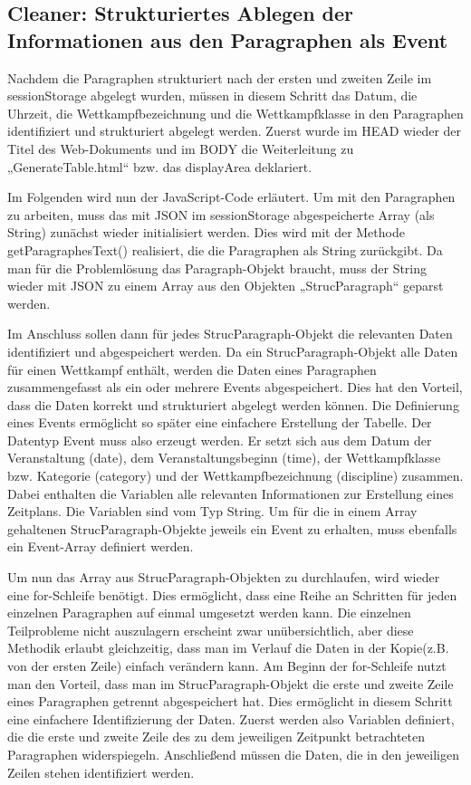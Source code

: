 {\subsection{Cleaner: Strukturiertes Ablegen der Informationen aus den Paragraphen als Event}

Nachdem die Paragraphen strukturiert nach der ersten und zweiten Zeile im sessionStorage abgelegt wurden, müssen in diesem Schritt das Datum, die Uhrzeit, die Wettkampfbezeichnung und die Wettkampfklasse in den Paragraphen identifiziert und strukturiert abgelegt werden. 
Zuerst wurde im HEAD wieder der Titel des Web-Dokuments und im BODY die Weiterleitung zu „GenerateTable.html“ bzw. das displayArea deklariert.

Im Folgenden wird nun der JavaScript-Code erläutert. Um mit den Paragraphen zu arbeiten, muss das mit JSON im sessionStorage abgespeicherte Array (als String) zunächst wieder initialisiert werden. Dies wird mit der Methode getParagraphesText() realisiert, die die Paragraphen als String zurückgibt. Da man für die Problemlösung das Paragraph-Objekt braucht, muss der String wieder mit \ac{JSON} zu einem Array aus den Objekten „StrucParagraph“ geparst werden.

Im Anschluss sollen dann für jedes StrucParagraph-Objekt die relevanten Daten identifiziert und abgespeichert werden. Da ein StrucParagraph-Objekt alle Daten für einen Wettkampf enthält, werden die Daten eines Paragraphen zusammengefasst als ein oder mehrere Events abgespeichert. Dies hat den Vorteil, dass die Daten korrekt und strukturiert abgelegt werden können. Die Definierung eines Events ermöglicht so später eine einfachere Erstellung der Tabelle. Der Datentyp Event muss also erzeugt werden. Er setzt sich aus dem Datum der Veranstaltung (date), dem Veranstaltungsbeginn (time), der Wettkampfklasse bzw. Kategorie (category) und der Wettkampfbezeichnung (discipline) zusammen. Dabei enthalten die Variablen alle relevanten Informationen zur Erstellung eines Zeitplans. Die Variablen sind vom Typ String. Um für die in einem Array gehaltenen StrucParagraph-Objekte jeweils ein Event zu erhalten, muss ebenfalls ein Event-Array definiert werden.

Um nun das Array aus StrucParagraph-Objekten zu durchlaufen, wird wieder eine for-Schleife benötigt. Dies ermöglicht, dass eine Reihe an Schritten für jeden einzelnen Paragraphen auf einmal umgesetzt werden kann. Die einzelnen Teilprobleme nicht auszulagern erscheint zwar unübersichtlich, aber diese Methodik erlaubt gleichzeitig, dass man im Verlauf die Daten in der Kopie(z.B. von der ersten Zeile) einfach verändern kann. 
Am Beginn der for-Schleife nutzt man den Vorteil, dass man im StrucParagraph-Objekt die erste und zweite Zeile eines Paragraphen getrennt abgespeichert hat. Dies ermöglicht in diesem Schritt eine einfachere Identifizierung der Daten. Zuerst werden also Variablen definiert, die die erste und zweite Zeile des zu dem jeweiligen Zeitpunkt betrachteten Paragraphen widerspiegeln. Anschließend müssen die Daten, die in den jeweiligen Zeilen stehen identifiziert werden.

}
